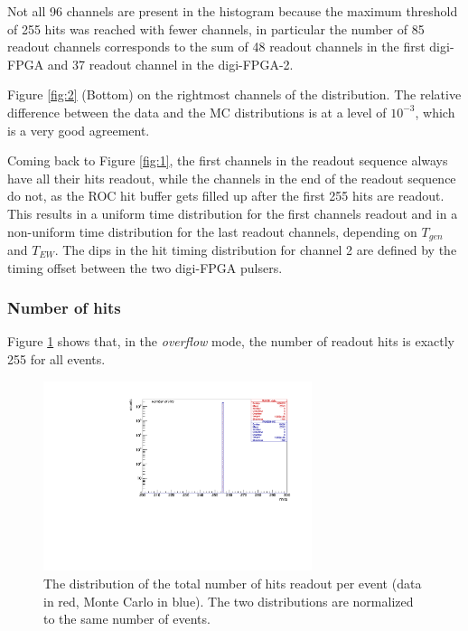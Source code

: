 Not all 96 channels are present in the 
histogram because the maximum 
threshold of 255 hits was reached with 
fewer channels, in particular the number of 
85 readout channels corresponds to the 
sum of 48 readout channels in the first 
digi-FPGA and 37 readout channel in the digi-FPGA-2.


Figure \ref{fig:2} (Bottom)  on the 
rightmost channels of the distribution.
The relative difference between the data and 
the MC distributions 
is at a level of $10^{-3}$, which is a 
very good agreement.


Coming back to Figure \ref{fig:1}, the first 
channels in the readout sequence
always have all their hits readout,
while the channels in the end of the readout sequence do not,
as the ROC hit buffer gets filled up after
the first 255 hits are readout.
This results in a uniform time distribution 
for the first channels readout and in a non-uniform
time distribution for the last readout channels, 
depending on $T_{gen}$ and $T_{EW}$.
The dips in the hit timing distribution for 
channel 2 are defined by the timing offset
between the two digi-FPGA pulsers. 


\subsubsection{Number of hits}
Figure \ref{fig:3} shows that, in the \textit{overflow} 
mode, the number of readout hits is exactly 255 for all events.

\begin{figure}[!h]
\centering
\includegraphics[width =0.7\textwidth]{figures/pdf/figure_00008_nhits_281.pdf}
\caption[The distribution of the total number of hits readout per event.]{
  The distribution of the total number of hits readout per event  
  (data in red, Monte Carlo in blue). The two distributions 
  are normalized to the same number of events.
}
\label{fig:3}
\end{figure}
